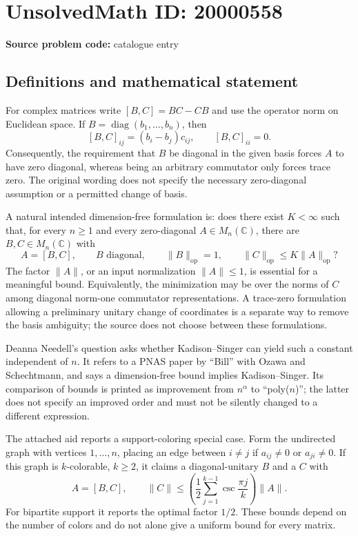 \documentclass[11pt]{article}
\newcommand{\C}{\mathbb{C}}
\begin{document}
\section*{UnsolvedMath ID: 20000558}
\textbf{Source problem code:} catalogue entry
\subsection{Definitions and mathematical statement}
For complex matrices write \([B,C]=BC-CB\) and use the operator norm on Euclidean space. If \(B=\operatorname{diag}(b_1,\ldots,b_n)\), then
\[
[B,C]_{ij}=(b_i-b_j)c_{ij},\qquad [B,C]_{ii}=0.
\]
Consequently, the requirement that \(B\) be diagonal in the given basis forces \(A\) to have zero diagonal, whereas being an arbitrary commutator only forces trace zero. The original wording does not specify the necessary zero-diagonal assumption or a permitted change of basis.

A natural intended dimension-free formulation is: does there exist \(K<\infty\) such that, for every \(n\geq1\) and every zero-diagonal \(A\in M_n(\C)\), there are \(B,C\in M_n(\C)\) with
\[
A=[B,C],\qquad B\text{ diagonal},\qquad\|B\|_{\mathrm{op}}=1,
\qquad \|C\|_{\mathrm{op}}\leq K\|A\|_{\mathrm{op}}?
\]
The factor \(\|A\|\), or an input normalization \(\|A\|\leq1\), is essential for a meaningful bound. Equivalently, the minimization may be over the norms of \(C\) among diagonal norm-one commutator representations. A trace-zero formulation allowing a preliminary unitary change of coordinates is a separate way to remove the basis ambiguity; the source does not choose between these formulations.

Deanna Needell's question asks whether Kadison--Singer can yield such a constant independent of \(n\). It refers to a PNAS paper by ``Bill'' with Ozawa and Schechtmann, and says a dimension-free bound implies Kadison--Singer. Its comparison of bounds is printed as improvement from \(n^\alpha\) to ``poly(\(n\))''; the latter does not specify an improved order and must not be silently changed to a different expression.

The attached aid reports a support-coloring special case. Form the undirected graph with vertices \(1,\ldots,n\), placing an edge between \(i\ne j\) if \(a_{ij}\ne0\) or \(a_{ji}\ne0\). If this graph is \(k\)-colorable, \(k\geq2\), it claims a diagonal-unitary \(B\) and a \(C\) with
\[
A=[B,C],\qquad
\|C\|\leq\left(\frac12\sum_{j=1}^{k-1}\csc\frac{\pi j}{k}\right)\|A\|.
\]
For bipartite support it reports the optimal factor \(1/2\). These bounds depend on the number of colors and do not alone give a uniform bound for every matrix.
\end{document}
